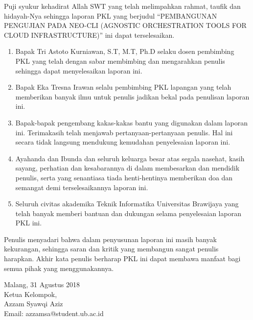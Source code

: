 \documentclass{pkl}
\begin{document}
{\preface

  Puji syukur kehadirat Allah SWT yang telah melimpahkan
  rahmat, taufik dan hidayah-Nya sehingga laporan PKL yang berjudul
  ``PEMBANGUNAN PENGUJIAN PADA NEO-CLI (AGNOSTIC
  ORCHESTRATION TOOLS FOR CLOUD INFRASTRUCTURE)'' ini dapat terselesaikan.

  \begin{enumerate}
  \item{Bapak Tri Astoto Kurniawan, S.T, M.T, Ph.D selaku dosen pembimbing PKL
      yang telah dengan sabar membimbing dan mengarahkan penulis
      sehingga dapat menyelesaikan laporan ini.}
  \item{Bapak Eka Tresna Irawan selalu pembimbing PKL lapangan yang
      telah memberikan banyak ilmu untuk penulis jadikan bekal pada
      penulisan laporan ini.}
  \item{Bapak-bapak pengembang kakas-kakas bantu yang digunakan dalam
      laporan ini. Terimakasih telah menjawab pertanyaan-pertanyaan
      penulis. Hal ini secara tidak langsung mendukung kemudahan
      penyelesaian laporan ini.}
  \item{Ayahanda dan Ibunda dan seluruh keluarga besar atas segala
      nasehat, kasih sayang, perhatian dan kesabarannya di dalam
      membesarkan dan mendidik penulis, serta yang senantiasa tiada
      henti-hentinya memberikan doa dan semangat demi terselesaikannya
      laporan ini.}
  \item{Seluruh civitas akademika Teknik Informatika Universitas
      Brawijaya yang telah banyak memberi bantuan dan dukungan selama
      penyelesaian laporan PKL ini.}
  \end{enumerate}

  Penulis menyadari bahwa dalam penyusunan laporan ini masih banyak kekurangan,
  sehingga saran dan kritik yang membangun sangat penulis harapkan. Akhir kata penulis
  berharap PKL ini dapat membawa manfaat bagi semua pihak yang menggunakannya.

  \vspace{0.8cm}


  \noindent
  \hspace*{8cm}Malang, 31 Agustus 2018 \\
  \hspace*{8cm}Ketua Kelompok, \vspace{1.5cm} \\

  \hspace*{6.8cm}Azzam Syawqi Aziz \\
  \hspace*{8cm}Email: azzamsa@student.ub.ac.id

}
\end{document}
